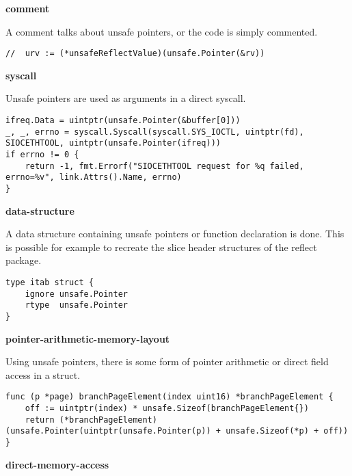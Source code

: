 \textbf{comment}

A comment talks about unsafe pointers, or the code is simply commented.

\begin{lstlisting}[language=Golang, label=lst:survey-small-classexample-comment, caption=Usage class example: comment]
// 	urv := (*unsafeReflectValue)(unsafe.Pointer(&rv))
\end{lstlisting}


\textbf{syscall}

Unsafe pointers are used as arguments in a direct syscall.

\begin{lstlisting}[language=Golang, label=lst:survey-small-classexample-syscall, caption=Usage class example: syscall]
ifreq.Data = uintptr(unsafe.Pointer(&buffer[0]))
_, _, errno = syscall.Syscall(syscall.SYS_IOCTL, uintptr(fd), SIOCETHTOOL, uintptr(unsafe.Pointer(ifreq)))
if errno != 0 {
    return -1, fmt.Errorf("SIOCETHTOOL request for %q failed, errno=%v", link.Attrs().Name, errno)
}
\end{lstlisting}


\textbf{data-structure}

A data structure containing unsafe pointers or function declaration is done.
This is possible for example to recreate the slice header structures of the reflect package.

\begin{lstlisting}[language=Golang, label=lst:survey-small-classexample-data-structure, caption=Usage class example: data-structure]
type itab struct {
    ignore unsafe.Pointer
    rtype  unsafe.Pointer
}
\end{lstlisting}


\textbf{pointer-arithmetic-memory-layout}

Using unsafe pointers, there is some form of pointer arithmetic or direct field access in a struct.

\begin{lstlisting}[language=Golang, label=lst:survey-small-classexample-pointer-arithmetic-memory-layout, caption=Usage class example: pointer-arithmetic-memory-layout]
func (p *page) branchPageElement(index uint16) *branchPageElement {
    off := uintptr(index) * unsafe.Sizeof(branchPageElement{})
    return (*branchPageElement)(unsafe.Pointer(uintptr(unsafe.Pointer(p)) + unsafe.Sizeof(*p) + off))
}
\end{lstlisting}


\textbf{direct-memory-access}

